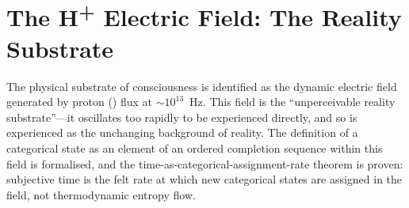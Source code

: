 \chapter{The \texorpdfstring{H\textsuperscript{+}}{H+} Electric Field: The Reality Substrate}
\label{ch:hplus_field}


\begin{chapterabstract}
The physical substrate of consciousness is identified as the dynamic electric field generated by proton (\Hplus) flux at $\sim 10^{13}$~Hz. This field is the ``unperceivable reality substrate''---it oscillates too rapidly to be experienced directly, and so is experienced as the unchanging background of reality. The definition of a categorical state as an element of an ordered completion sequence within this field is formalised, and the time-as-categorical-assignment-rate theorem is proven: subjective time is the felt rate at which new categorical states are assigned in the \Hplus field, not thermodynamic entropy flow.
\end{chapterabstract}


